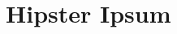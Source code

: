 \documentclass[class=myArticleClass, float=false, crop=false]{standalone}
\begin{document}
\section{Hipster Ipsum}
\label{sHI}
\end{document}
